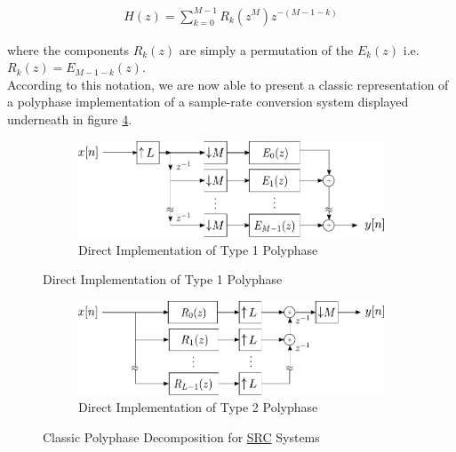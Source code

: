 \begin{align}
	H(z) = \sum\limits_{k=0}^{M-1} R_k(z^M)z^{-(M-1-k)} \label{eqn:poly2}
\end{align}

where the components $R_k(z)$ are simply a permutation of the $E_k(z)$ i.e. $R_k(z) = E_{M-1-k}(z)$.\\ 

According to this notation, we are now able to present a classic representation of a polyphase implementation of a sample-rate conversion system displayed underneath in figure \ref{Figure 3.7}.


\begin{figure}[htb!]
	\centering
	\begin{subfigure}[b]{\textwidth}
		\centering
		\includegraphics[scale=0.95]{polyphase_direct_M.pdf}
		\vspace*{1mm}
		\caption{Direct Implementation of Type 1 Polyphase}\label{3.7.a}
	\end{subfigure}	
\end{figure}



\begin{figure}[htb!] %
	\centering
	\begin{subfigure}[b]{\textwidth}
		\centering
		\includegraphics[scale=0.95]{polyphase_direct_L.pdf}%
		\vspace*{1mm}
		\caption{Direct Implementation of Type 2 Polyphase}\label{3.7.b}
	\end{subfigure}	
	\caption{Classic Polyphase Decomposition for \protect\hyperlink{SRC}{SRC} Systems}
	\label{Figure 3.7}
\end{figure}

